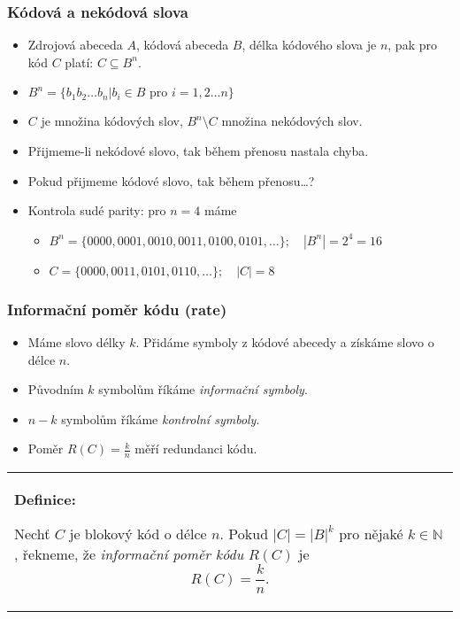 \documentclass{beamer}
\newenvironment{definice}
{
    \begin{center}
    \begin{tabular}{p{9cm}}
    \textbf{Definice:}
}
{
    \end{tabular}
    \end{center}
}
\newenvironment{itemize4}%
  {\large \begin{itemize}%
    \setlength{\itemsep}{4pt}%
    \setlength{\parskip}{4pt}}%
  {\end{itemize}}
\newenvironment{itemizey}%
  {\large \begin{itemize}%
    \setlength{\itemsep}{6pt}%
    \setlength{\parskip}{6pt}}%
  {\end{itemize}}
\begin{document}
\begin{frame}[t,fragile]\frametitle{Kódová a nekódová slova} 
    \begin{itemizey}
        \item Zdrojová abeceda $A$, kódová abeceda $B$, délka kódového slova je $n$, pak pro kód $C$ platí: $C\subseteq B^n$.
        \item $B^n=\{b_1b_2\dots b_n|b_i\in B \mbox{ pro } i = 1,2\dots n\}$
        \item $C$ je množina kódových slov, $B^n\setminus C$ množina nekódových slov.
        \item Přijmeme-li nekódové slovo, tak během přenosu nastala chyba.
        \item Pokud přijmeme kódové slovo, tak během přenosu\dots?
        \item Kontrola sudé parity: pro $n=4$ máme 
            \begin{itemize}
                \item $B^n=\{0000, 0001, 0010, 0011, 0100, 0101, \dots\}; \quad |B^n|=2^4=16$
                \item $C=\{0000, 0011, 0101, 0110, \dots\}; \quad |C|=8$
            \end{itemize}
    \end{itemizey}
\end{frame}



\begin{frame}[t,fragile]\frametitle{Informační poměr kódu (rate)} 
    \begin{itemize4}
        \item Máme slovo délky $k$. Přidáme symboly z kódové abecedy a získáme slovo o délce $n$.
        \item Původním $k$ symbolům říkáme \textit{informační symboly}.
        \item $n-k$ symbolům říkáme \textit{kontrolní symboly}.
        \item Poměr $R(C)=\frac{k}{n}$ měří redundanci kódu.
    \end{itemize4}

    \begin{definice}
    Nechť $C$ je blokový kód o délce $n$. Pokud $|C|=|B|^k$ pro nějaké $k\in\mathbb{N}$, řekneme, že \textit{informační poměr kódu} $R(C)$ je
    $$
    R(C) = \frac{k}{n}.
    $$
    \end{definice}
\end{frame}
\end{document}
